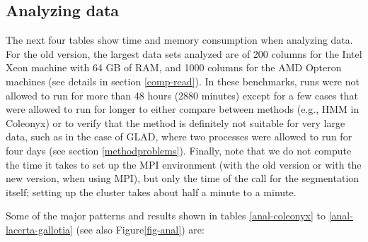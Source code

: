\documentclass[a4paper,11pt]{article}
\begin{document}
\clearpage
\subsection{Analyzing data}\label{comp-anal}
The next four tables show time and memory consumption when analyzing
data. For the old version, the largest data sets analyzed are of 200
columns for the Intel Xeon machine with 64 GB of RAM, and 1000 columns for
the AMD Opteron machines (see details in section \ref{comp-read}). In
these benchmarks, runs were not allowed to run for more than 48 hours
(2880 minutes) except for a few cases that were allowed to run for longer
to either compare between methods (e.g., HMM in Coleonyx) or to verify
that the method is definitely not suitable for very large data, such as in
the case of GLAD, where two processes were allowed to run for four days
(see section \ref{methodproblems}). Finally, note that we do not compute
the time it takes to set up the MPI environment (with the old version or
with the new version, when using MPI), but only the time of the call for
the segmentation itself; setting up the cluster takes about half a minute
to a minute.


Some of the major patterns and results shown in tables \ref{anal-coleonyx}
to \ref{anal-lacerta-gallotia} (see also Figure\ref{fig-anal}) are:
\end{document}
